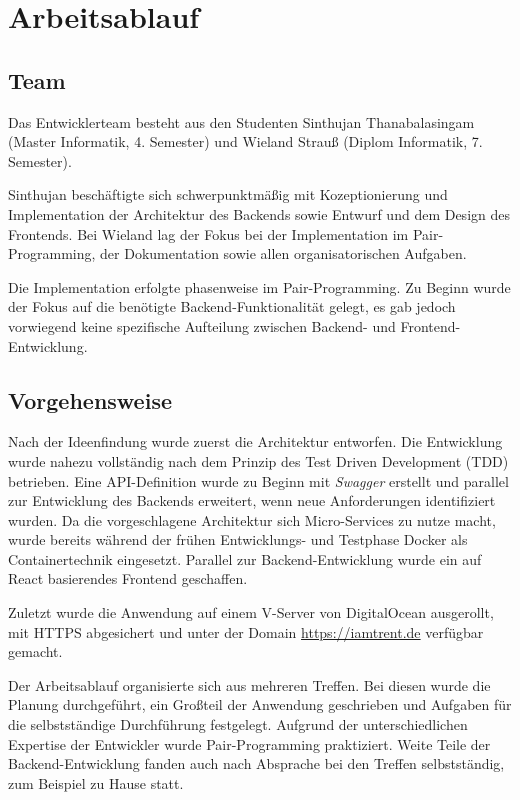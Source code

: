 

\section{Arbeitsablauf}

\subsection{Team}

Das Entwicklerteam besteht aus den Studenten Sinthujan Thanabalasingam  (Master Informatik, 4. Semester) und Wieland Strauß (Diplom Informatik, 7. Semester). 

Sinthujan beschäftigte sich schwerpunktmäßig mit Kozeptionierung und Implementation der Architektur des Backends sowie Entwurf und dem Design des Frontends. Bei Wieland lag der Fokus bei der Implementation im Pair-Programming, der Dokumentation sowie allen organisatorischen Aufgaben.

Die Implementation erfolgte phasenweise im Pair-Programming. Zu Beginn wurde der Fokus auf die benötigte Backend-Funktionalität gelegt, es gab jedoch vorwiegend keine spezifische Aufteilung zwischen Backend- und Frontend-Entwicklung.  

\subsection{Vorgehensweise}

Nach der Ideenfindung wurde zuerst die Architektur entworfen. 
Die Entwicklung wurde nahezu vollständig nach dem Prinzip des Test Driven Development (TDD) betrieben. 
Eine API-Definition wurde zu Beginn mit \textit{Swagger} erstellt und parallel zur Entwicklung des Backends erweitert, wenn neue Anforderungen identifiziert wurden. Da die vorgeschlagene Architektur sich Micro-Services zu nutze macht, wurde bereits während der frühen Entwicklungs- und Testphase Docker als Containertechnik eingesetzt.
Parallel zur Backend-Entwicklung wurde ein auf React basierendes Frontend geschaffen.

Zuletzt wurde die Anwendung auf einem V-Server von DigitalOcean ausgerollt, mit HTTPS abgesichert und unter der Domain \url{https://iamtrent.de} verfügbar gemacht.

Der Arbeitsablauf organisierte sich aus mehreren Treffen. Bei diesen wurde die Planung durchgeführt, ein Großteil der Anwendung geschrieben und Aufgaben für die selbstständige Durchführung festgelegt. Aufgrund der unterschiedlichen Expertise der Entwickler wurde Pair-Programming praktiziert. Weite Teile der Backend-Entwicklung fanden auch nach Absprache bei den Treffen selbstständig, zum Beispiel zu Hause statt.  


